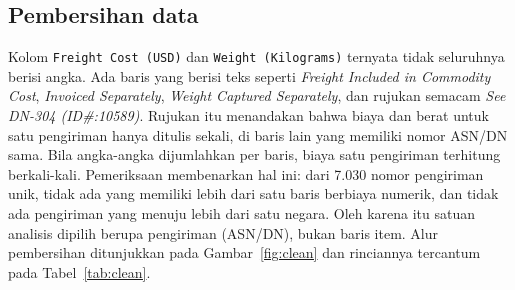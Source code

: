 \documentclass[a4paper,11pt]{article}
\begin{document}
\subsection{Pembersihan data}
\label{sec:cleaning}
Kolom \texttt{Freight Cost (USD)} dan \texttt{Weight (Kilograms)} ternyata tidak seluruhnya berisi angka. Ada baris yang berisi teks seperti \textit{Freight Included in Commodity Cost}, \textit{Invoiced Separately}, \textit{Weight Captured Separately}, dan rujukan semacam \textit{See DN-304 (ID\#:10589)}. Rujukan itu menandakan bahwa biaya dan berat untuk satu pengiriman hanya ditulis sekali, di baris lain yang memiliki nomor ASN/DN sama. Bila angka-angka dijumlahkan per baris, biaya satu pengiriman terhitung berkali-kali. Pemeriksaan membenarkan hal ini: dari 7.030 nomor pengiriman unik, tidak ada yang memiliki lebih dari satu baris berbiaya numerik, dan tidak ada pengiriman yang menuju lebih dari satu negara. Oleh karena itu satuan analisis dipilih berupa pengiriman (ASN/DN), bukan baris item. Alur pembersihan ditunjukkan pada Gambar~\ref{fig:clean} dan rinciannya tercantum pada Tabel~\ref{tab:clean}.
\end{document}
